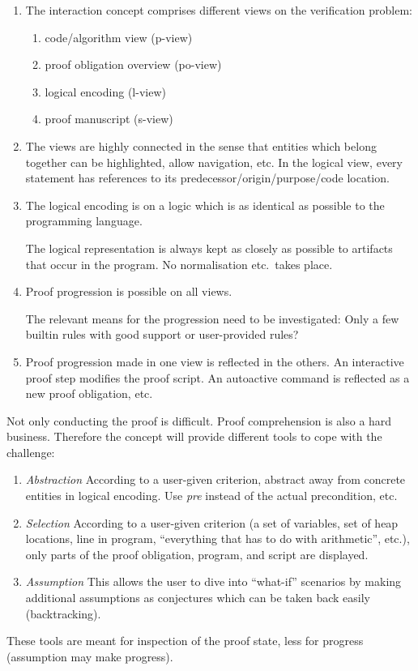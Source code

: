 \documentclass{article}
\begin{document}
\begin{enumerate}
\item The interaction concept comprises different views on the
  verification problem:
  \begin{enumerate}
  \item code/algorithm view (p-view)
  \item proof obligation overview (po-view)
  \item logical encoding (l-view)
  \item proof manuscript (s-view)
  \end{enumerate}

\item The views are highly connected in the sense that entities which
  belong together can be highlighted, allow navigation, etc.  In the
  logical view, every statement has references to its
  predecessor/origin/purpose/code location.

\item The logical encoding is on a logic which is as identical as
  possible to the programming language.

  The logical representation is always kept as closely as possible to
  artifacts that occur in the program. No normalisation etc.\ takes
  place.

\item Proof progression is possible on all views.

  The relevant means for the progression need to be investigated: Only
  a few builtin rules with good support or user-provided rules?

\item Proof progression made in one view is reflected in the others.
  An interactive proof step modifies the proof script. An autoactive
  command is reflected as a new proof obligation, etc.
\end{enumerate}

Not only conducting the proof is difficult. Proof comprehension is
also a hard business. Therefore the concept will provide different
tools to cope with the challenge:
\begin{enumerate}
\item \emph{Abstraction} According to a user-given criterion, abstract
  away from concrete entities in logical encoding. Use \emph{pre}
  instead of the actual precondition, etc.
\item \emph{Selection} According to a user-given criterion (a set of
  variables, set of heap locations, line in program, ``everything that
  has to do with arithmetic'', etc.), only parts of the proof
  obligation, program, and script are displayed.
\item \emph{Assumption} This allows the user to dive into ``what-if''
  scenarios by making additional assumptions as conjectures which can
  be taken back easily (backtracking).
\end{enumerate}
These tools are meant for inspection of the proof state, less for
progress (assumption may make progress).
\end{document}
